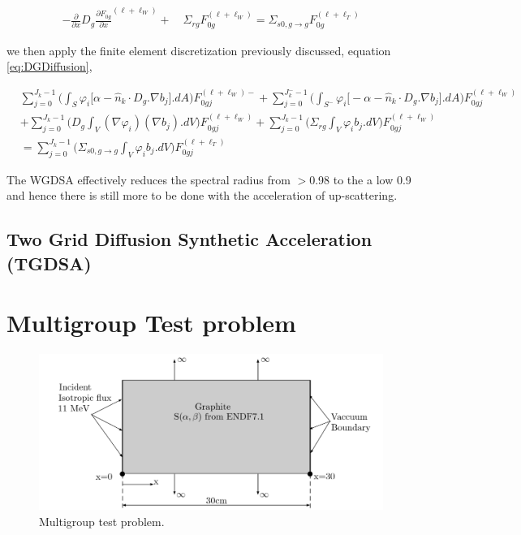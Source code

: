 \documentclass[11pt,letterpaper,titlepage]{article}
\numberwithin{equation}{section}
\newcommand{\beqn}{\begin{equation}
	\begin{aligned}}
\newcommand{\eeqn}{\end{aligned}
	\end{equation}}
\begin{document}
\beqn
-\frac{\partial }{\partial x} D_g \frac{\partial F_{0g}}{\partial x}^{(\ell+\ell_W)}  
+ \quad \Sigma_{rg} F_{0g}^{(\ell+\ell_W)}
=
\Sigma_{s0,g{\to}g} F_{0g}^{(\ell+\ell_T)}
\eeqn 

we then apply the finite element discretization previously discussed, equation \ref{eq:DGDiffusion}, 

\beqn
&\sum_{j=0}^{J_k -1} 
\biggr(
 \int_{S} \varphi_i \biggr[
 \alpha - \hat{n}_k\cdot D_g.\nabla b_j
\biggr] .dA 
\biggr) F_{0gj}^{(\ell+\ell_W)-}
+
\sum_{j=0}^{J_k^- -1} 
\biggr(
 \int_{S^-} \varphi_i \biggr[
 -\alpha - \hat{n}_k\cdot D_g.\nabla b_j
\biggr] .dA 
\biggr) F_{0gj}^{(\ell+\ell_W)}  \\
&+ \sum_{j=0}^{J_k-1} \biggr( D_g  \int_V ( \nabla \varphi_i ) ( \nabla b_j).dV \biggr) F_{0gj}^{(\ell+\ell_W)} 
+ \sum_{j=0}^{J_k-1} \biggr( \Sigma_{rg}\int_V \varphi_i b_j.dV \biggr) F_{0gj}^{(\ell+\ell_W)}  \\
&= 
\sum_{j=0}^{J_k-1}  \biggr( \Sigma_{s0,g \to g}   \int_V \varphi_i b_j.dV \biggr) F_{0gj}^{(\ell+\ell_T)} 
\eeqn

The WGDSA effectively reduces the spectral radius from $>$0.98 to the a low 0.9 and hence there is still more to be done with the acceleration of up-scattering.


\newpage
\subsection{Two Grid Diffusion Synthetic Acceleration (TGDSA)}






\newpage
\section{Multigroup Test problem}

\begin{figure}[H]
\centering
\includegraphics[width=0.8\linewidth]{images/MGProblem.png}
\caption{Multigroup test problem.}
\label{fig:MGProblem}
\end{figure}
\end{document}
